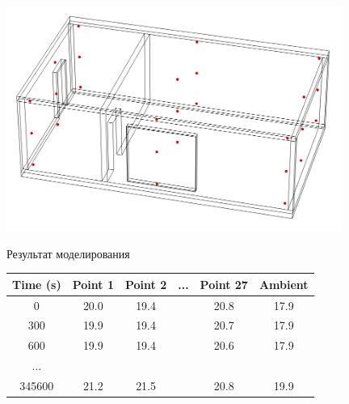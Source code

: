 \documentclass[14pt,aspectratio=169,hyperref={pdftex,unicode},xcolor=dvipsnames]{beamer}
\begin{document}
\begin{frame}

\begin{center}
\includegraphics[width=11cm]{images/interesting_points.png}
\end{center}

\end{frame}



\begin{frame}{Результат моделирования}
\centering
\begin{table}[]
\begin{tabular}{c|c|c|c|c|c}
\textbf{Time (s)} & \textbf{Point 1} & \textbf{Point 2} & ... & \textbf{Point 27} & \textbf{Ambient} \\ \hline
0                 & 20.0             & 19.4             &     & 20.8              & 17.9             \\
300               & 19.9             & 19.4             &     & 20.7              & 17.9             \\
600               & 19.9             & 19.4             &     & 20.6              & 17.9             \\
...               &                  &                  &     &                   &                  \\
345600            & 21.2             & 21.5             &     & 20.8              & 19.9            
\end{tabular}
\end{table}

\end{frame}
\end{document}
